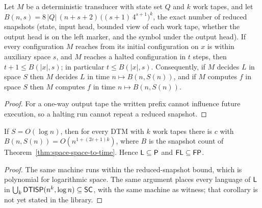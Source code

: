 \begin{theorem}
  \label{thm:space-space-to-time}
  \leanok
  Let $M$ be a deterministic transducer with state set $Q$ and $k$ work tapes,
  and let
  $B(n, s) = 8\,|Q|\,(n + s + 2)\,\bigl((s + 1)\,4^{s + 1}\bigr)^k$, the exact
  number of reduced snapshots (state, input head, bounded view of each work
  tape, whether the output head is on the left marker, and the symbol under the
  output head). If every configuration $M$ reaches from its initial
  configuration on $x$ is within auxiliary space $s$, and $M$ reaches a halted
  configuration in $t$ steps, then $t + 1 \le B(|x|, s)$; in particular
  $t \le B(|x|, s)$. Consequently, if $M$ decides $L$ in space $S$ then $M$
  decides $L$ in time $n \mapsto B(n, S(n))$, and if $M$ computes $f$ in space
  $S$ then $M$ computes $f$ in time $n \mapsto B(n, S(n))$.
\end{theorem}
\begin{proof}
  \leanok
  For a one-way output tape the written prefix cannot influence future
  execution, so a halting run cannot repeat a reduced snapshot.
\end{proof}

\begin{theorem}
  \label{thm:space-L-subset-P}
  \leanok
  If $S = O(\log n)$, then for every DTM with $k$ work tapes there is $c$ with
  $B(n, S(n)) = O(n^{1 + (2c + 1)k})$, where $B$ is the snapshot count of
  Theorem~\ref{thm:space-space-to-time}. Hence $\mathsf{L} \subseteq \mathsf{P}$ and
  $\mathsf{FL} \subseteq \mathsf{FP}$.
\end{theorem}
\begin{proof}
  \leanok
  The same machine runs within the reduced-snapshot bound, which is polynomial
  for logarithmic space. The same argument places every language of $\mathsf{L}$
  in $\bigcup_k \mathsf{DTISP}(n^k, \log n) \subseteq \mathsf{SC}$, with the same
  machine as witness; that corollary is not yet stated in the library.
\end{proof}

